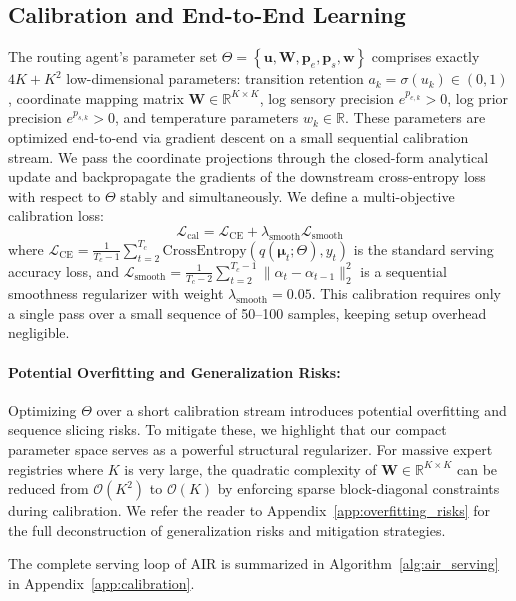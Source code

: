 \subsection{Calibration and End-to-End Learning}
The routing agent's parameter set $\Theta = \left\{ \mathbf{u}, \mathbf{W}, \mathbf{p}_e, \mathbf{p}_s, \mathbf{w} \right\}$ comprises exactly $4K + K^2$ low-dimensional parameters: transition retention $a_k = \sigma(u_k) \in (0,1)$, coordinate mapping matrix $\mathbf{W} \in \mathbb{R}^{K \times K}$, log sensory precision $e^{p_{e, k}} > 0$, log prior precision $e^{p_{s, k}} > 0$, and temperature parameters $w_k \in \mathbb{R}$. These parameters are optimized end-to-end via gradient descent on a small sequential calibration stream. We pass the coordinate projections through the closed-form analytical update and backpropagate the gradients of the downstream cross-entropy loss with respect to $\Theta$ stably and simultaneously. We define a multi-objective calibration loss:
\begin{equation}
\mathcal{L}_{\text{cal}} = \mathcal{L}_{\text{CE}} + \lambda_{\text{smooth}} \mathcal{L}_{\text{smooth}}
\end{equation}
where $\mathcal{L}_{\text{CE}} = \frac{1}{T_c-1} \sum_{t=2}^{T_c} \text{CrossEntropy}(q(\mathbf{\mu}_t; \Theta), y_t)$ is the standard serving accuracy loss, and $\mathcal{L}_{\text{smooth}} = \frac{1}{T_c-2} \sum_{t=2}^{T_c-1} \| \alpha_t - \alpha_{t-1} \|_2^2$ is a sequential smoothness regularizer with weight $\lambda_{\text{smooth}} = 0.05$. This calibration requires only a single pass over a small sequence of 50--100 samples, keeping setup overhead negligible.

\paragraph{Potential Overfitting and Generalization Risks:}
Optimizing $\Theta$ over a short calibration stream introduces potential overfitting and sequence slicing risks. To mitigate these, we highlight that our compact parameter space serves as a powerful structural regularizer. For massive expert registries where $K$ is very large, the quadratic complexity of $\mathbf{W} \in \mathbb{R}^{K \times K}$ can be reduced from $\mathcal{O}(K^2)$ to $\mathcal{O}(K)$ by enforcing sparse block-diagonal constraints during calibration. We refer the reader to Appendix~\ref{app:overfitting_risks} for the full deconstruction of generalization risks and mitigation strategies.

The complete serving loop of AIR is summarized in Algorithm~\ref{alg:air_serving} in Appendix~\ref{app:calibration}.
